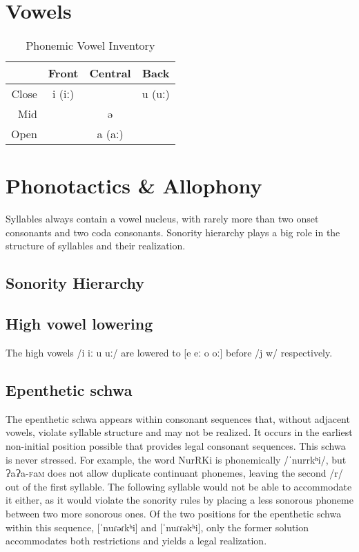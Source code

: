 \documentclass[a4paper,10pt,twoside,openright]{memoir}
\newcommand{\lang}{{\bigglot}a{\bigglot}a-\textsc{f}a\textsc{m}}
\newcommand{\longv}{ː}
\newcommand{\bigglot}{Ɂ}
\newcommand\famword[1]{{\addfontfeatures{Letters=UppercaseSmallCaps}#1}}
\begin{document}
\section{Vowels}

\begin{table}[ht]
    \centering
    \begin{tabular}{rccc}
    \toprule
          & Front & Central & Back \\
    \midrule
    Close & i (i\longv{}) & & u (u\longv) \\
    Mid   & & ə & \\
    Open  & & a (a\longv) & \\
    \bottomrule
    \end{tabular}
    \caption{Phonemic Vowel Inventory}
    \label{tab:vowelinv}
\end{table}

\section{Phonotactics \& Allophony}

Syllables always contain a vowel nucleus, with rarely more than two onset consonants and two coda consonants. Sonority hierarchy plays a big role in the structure of syllables and their realization.

\subsection{Sonority Hierarchy}
\subsection{High vowel lowering}

The high vowels /i i\longv{} u u\longv/ are lowered to [e e\longv{} o o\longv{}] before /j w/ respectively.

\subsection{Epenthetic schwa}

The epenthetic schwa appears within consonant sequences that, without adjacent vowels, violate syllable structure and may not be realized. It occurs in the earliest non-initial position possible that provides legal consonant sequences. This schwa is never stressed. For example, the word \famword{NurRKi} is phonemically /ˈnurrkʰi/, but \lang{} does not allow duplicate continuant phonemes, leaving the second /r/ out of the first syllable. The following syllable would not be able to accommodate it either, as it would violate the sonority rules by placing a less sonorous phoneme between two more sonorous ones. Of the two positions for the epenthetic schwa within this sequence, [ˈnuɾəɾkʰi] and [ˈnuɾɾəkʰi], only the former solution accommodates both restrictions and yields a legal realization.
\end{document}
